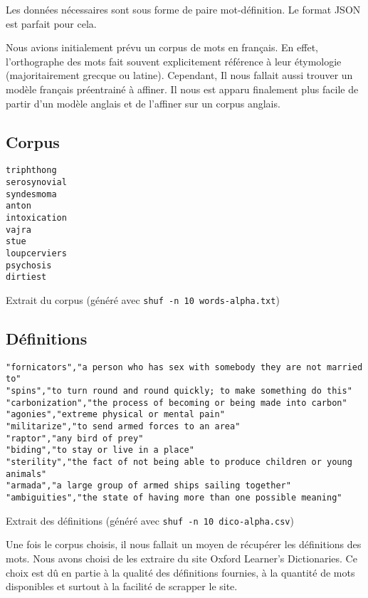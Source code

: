 \documentclass[french]{template}
\begin{document}
Les données nécessaires sont sous forme de paire mot-définition. Le format JSON est parfait pour cela.

Nous avions initialement prévu un corpus de mots en français. En effet, l'orthographe des mots fait souvent explicitement référence à leur étymologie (majoritairement grecque ou latine). Cependant, Il nous fallait aussi trouver un modèle français préentrainé à affiner. Il nous est apparu finalement plus facile de partir d'un modèle anglais et de l'affiner sur un corpus anglais.

\subsection{Corpus}

\begin{listing}[H]
    \begin{verbatim}
triphthong
serosynovial
syndesmoma
anton
intoxication
vajra
stue
loupcerviers
psychosis
dirtiest
\end{verbatim}
    \caption{Extrait du corpus (généré avec \texttt{shuf -n 10 words-alpha.txt})}
\end{listing}

\subsection{Définitions}

\begin{listing}[H]
    \begin{verbatim}
"fornicators","a person who has sex with somebody they are not married to"
"spins","to turn round and round quickly; to make something do this"
"carbonization","the process of becoming or being made into carbon"
"agonies","extreme physical or mental pain"
"militarize","to send armed forces to an area"
"raptor","any bird of prey"
"biding","to stay or live in a place"
"sterility","the fact of not being able to produce children or young animals"
"armada","a large group of armed ships sailing together"
"ambiguities","the state of having more than one possible meaning"
\end{verbatim}
    \caption{Extrait des définitions (généré avec \texttt{shuf -n 10 dico-alpha.csv})}
\end{listing}

Une fois le corpus choisis, il nous fallait un moyen de récupérer les définitions des mots. Nous avons choisi de les extraire du site Oxford Learner's Dictionaries. Ce choix est dû en partie à la qualité des définitions fournies, à la quantité de mots disponibles et surtout à la facilité de scrapper le site.
\end{document}
